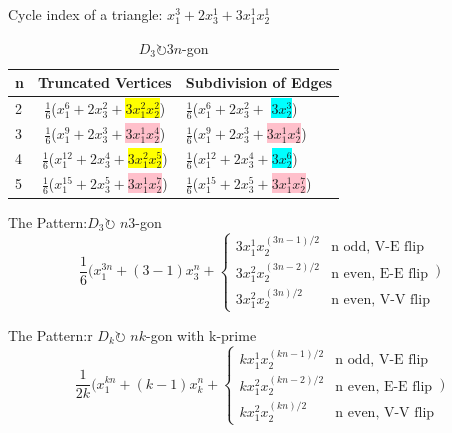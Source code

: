 \documentclass{beamer}
\begin{document}
\begin{frame}
	Cycle index of a triangle:
	$x_1^3+2x_3^1+3x_1^1 x_2^1$\\

	\begin{table}
		\centering
		\begin{tabular}{l|c|l}
			n &
            Truncated Vertices &
            Subdivision of Edges\\ \hline
			2 &
            $\frac{1}{6}$($x_1^6+2x_3^2+$\colorbox{yellow}{$3x_1^2x_2^2$}) &
            $\frac{1}{6}$($x_1^6+2x_3^2+$ \colorbox{cyan}{$3x_2^3$})\\
			3 &
            $\frac{1}{6}$($x_1^9+2x_3^3+$\colorbox{pink}{$3x_1^1x_2^4$})  &
            $\frac{1}{6}$($x_1^9+2x_3^3+$\colorbox{pink}{$3x_1^1x_2^4$})\\
			4 &
            $\frac{1}{6}$($x_1^{12}+2x_3^4+$\colorbox{yellow}{$3x_1^2x_2^5$}) &
            $\frac{1}{6}$($x_1^{12}+2x_3^4+$\colorbox{cyan}{$3x_2^6$})\\
			5&
            $\frac{1}{6}$($x_1^{15}+2x_3^5+$\colorbox{pink}{$3x_1^1x_2^7$}) &
			$\frac{1}{6}$($x_1^{15}+2x_3^5+$\colorbox{pink}{$3x_1^1x_2^7$})\\
		\end{tabular}
		\caption{$D_3 \circlearrowright 3n$-gon}
	\end{table}
\end{frame}
\begin{frame}{The Pattern:$D_3 \circlearrowright$ $n3$-gon}
\[\dfrac{1}{6}\Bigg(x_1^{3n}+(3-1)x_3^n +
\begin{cases}
3x_1^1x_2^{(3n-1)/2} & \text{n odd, V-E flip} \\
3x_1^2x_2^{(3n-2)/2} & \text{n even, E-E flip}\\
3x_1^2x_2^{(3n)/2} & \text{n even, V-V flip}
\end{cases}\Bigg)\]
 \end{frame}
 \begin{frame}{The Pattern:r $D_k \circlearrowright$ $nk$-gon with k-prime}
\[\dfrac{1}{2k}\Bigg(x_1^{kn}+(k-1)x_k^n +
\begin{cases}
kx_1^1x_2^{(kn-1)/2} & \text{n odd, V-E flip} \\
kx_1^2x_2^{(kn-2)/2} & \text{n even, E-E flip}\\
kx_1^2x_2^{(kn)/2} & \text{n even, V-V flip}
\end{cases}\bigg)\]
 \end{frame}
\end{document}
